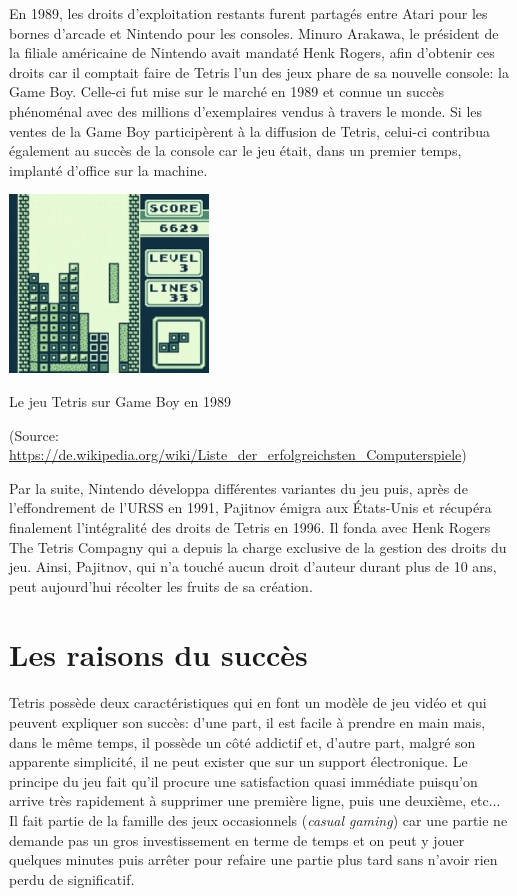 En 1989, les droits d'exploitation restants furent partagés entre Atari pour les bornes d'arcade et Nintendo pour les consoles. Minuro Arakawa, le président de la filiale américaine de Nintendo avait mandaté Henk Rogers, afin d'obtenir ces droits car il comptait faire de Tetris l'un des jeux phare de sa nouvelle console: la Game Boy. Celle-ci fut mise sur le marché en 1989 et connue un succès phénoménal avec des millions d'exemplaires vendus à travers le monde. Si les ventes de la Game Boy participèrent à la diffusion de Tetris, celui-ci contribua également au succès de la console car le jeu était, dans un premier temps, implanté d'office sur la machine.

\begin{center}
	\includegraphics{../media/Tetrisgb.jpg}
	
	Le jeu Tetris sur Game Boy en 1989
	
	(Source: \url{ https://de.wikipedia.org/wiki/Liste_der_erfolgreichsten_Computerspiele})
\end{center} 

Par la suite, Nintendo développa différentes variantes du jeu puis, après de l'effondrement de l'URSS en 1991, Pajitnov émigra aux \'Etats-Unis et récupéra finalement l'intégralité des droits de Tetris en 1996. Il fonda avec Henk Rogers The Tetris Compagny qui a depuis la charge exclusive de la gestion des droits du jeu. Ainsi, Pajitnov, qui n'a touché aucun droit d'auteur durant plus de 10 ans, peut aujourd'hui récolter les fruits de sa création.

\section{Les raisons du succès}

Tetris possède deux caractéristiques qui en font un modèle de jeu vidéo et qui peuvent expliquer son succès: d'une part, il est facile à prendre en main mais, dans le même temps, il possède un côté addictif et, d'autre part, malgré son apparente simplicité, il ne peut exister que sur un support électronique. Le principe du jeu fait qu'il procure une satisfaction quasi immédiate puisqu'on arrive très rapidement à supprimer une première ligne, puis une deuxième, etc... Il fait partie de la famille des \og jeux occasionnels \fg{} (\textit{casual gaming}) car une partie ne demande pas un gros investissement en terme de temps et on peut y jouer quelques minutes puis arrêter pour refaire une partie plus tard sans n'avoir rien perdu de significatif. 

